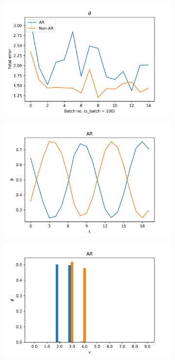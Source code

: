 \documentclass[12pt]{article}
\begin{document}
\begin{figure}[H]
  \centering
  \begin{subfigure}[b]{0.3\textwidth}
    \includegraphics[width=\linewidth]{performance_thetas-1.png}
  \end{subfigure}%
  \begin{subfigure}[b]{0.3\textwidth}
    \includegraphics[width=\linewidth]{latent_thetas_AR_1.png}
  \end{subfigure}%
  \begin{subfigure}[b]{0.3\textwidth}
    \includegraphics[width=\linewidth]{latent_phis_AR_1.png}
  \end{subfigure}%


\end{figure}
\end{document}
